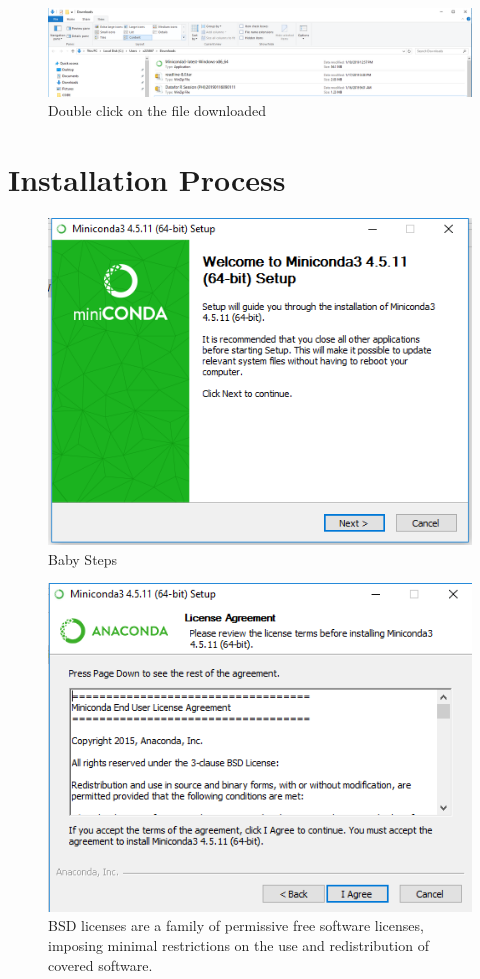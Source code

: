 \documentclass{report}
\begin{document}
\begin{figure}[H]
\centering
\includegraphics[width=1.2\textwidth]{./images/download.PNG}
\caption{Double click on the file downloaded}
\end{figure}


\section*{Installation Process}

\begin{figure}[H]
\centering
\includegraphics{./images/Welcome.PNG}
\caption{Baby Steps}
\end{figure}

\begin{figure}[H]
\centering
\includegraphics{./images/Liscence.PNG}
\caption{BSD licenses are a family of permissive free software licenses, imposing minimal restrictions on the use and redistribution of covered software.}
\end{figure}
\end{document}
